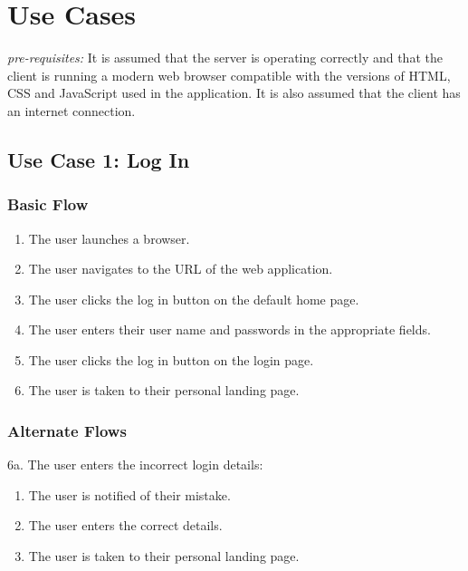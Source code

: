 \documentclass[12pt,onecolumn]{article}
\begin{document}
\newpage

\appendix

\section{Use Cases} \label{moreusecase}

\emph{pre-requisites:} It is assumed that the server is operating correctly and that the client is running a modern web browser compatible with the versions of HTML, CSS and JavaScript used in the application. It is also assumed that the client has an internet connection.

	\subsection{Use Case 1: Log In}

		\subsubsection{Basic Flow}

		\begin{enumerate}
			\item The user launches a browser.

			\item The user navigates to the URL of the web application.

			\item The user clicks the log in button on the default home page.

			\item The user enters their user name and passwords in the appropriate fields.

			\item The user clicks the log in button on the login page.

			\item The user is taken to their personal landing page.

		\end{enumerate}

		\subsubsection{Alternate Flows}

		6a. The user enters the incorrect login details:

		\begin{enumerate}
			\item The user is notified of their mistake.

			\item The user enters the correct details.

			\item The user is taken to their personal landing page.
		\end{enumerate}
		
\end{document}
